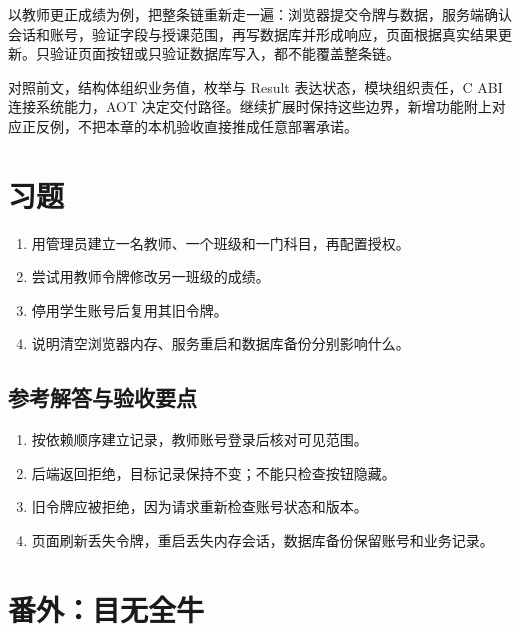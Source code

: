 以教师更正成绩为例，把整条链重新走一遍：浏览器提交令牌与数据，服务端确认会话和账号，验证字段与授课范围，再写数据库并形成响应，页面根据真实结果更新。只验证页面按钮或只验证数据库写入，都不能覆盖整条链。

对照前文，结构体组织业务值，枚举与 Result 表达状态，模块组织责任，C ABI 连接系统能力，AOT 决定交付路径。继续扩展时保持这些边界，新增功能附上对应正反例，不把本章的本机验收直接推成任意部署承诺。

\section{习题}

\begin{enumerate}

\item 用管理员建立一名教师、一个班级和一门科目，再配置授权。

\item 尝试用教师令牌修改另一班级的成绩。

\item 停用学生账号后复用其旧令牌。

\item 说明清空浏览器内存、服务重启和数据库备份分别影响什么。

\end{enumerate}

\subsection*{参考解答与验收要点}

\begin{enumerate}

\item 按依赖顺序建立记录，教师账号登录后核对可见范围。

\item 后端返回拒绝，目标记录保持不变；不能只检查按钮隐藏。

\item 旧令牌应被拒绝，因为请求重新检查账号状态和版本。

\item 页面刷新丢失令牌，重启丢失内存会话，数据库备份保留账号和业务记录。

\end{enumerate}

\section{番外：目无全牛}

